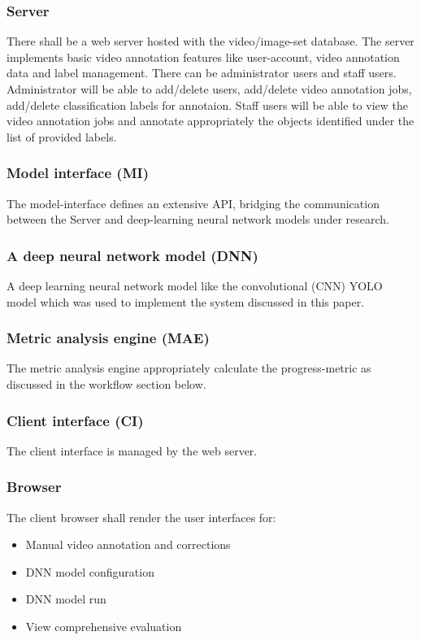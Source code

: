 \documentclass[conference]{IEEEtran}
\begin{document}
\subsubsection{Server}
There shall be a web server hosted with the video/image-set database. The server implements basic video annotation features like user-account, video annotation data and label management. There can be administrator users and staff users. Administrator will be able to add/delete users, add/delete video annotation jobs, add/delete classification labels for annotaion. Staff users will be able to view the video annotation jobs and annotate appropriately the objects identified under the list of provided labels.
\subsubsection{Model interface (MI)}
The model-interface defines an extensive API, bridging the communication between the Server and deep-learning neural network models under research.
\subsubsection{A deep neural network model (DNN)}
A deep learning neural network model like the convolutional (CNN) YOLO model which was used to implement the system discussed in this paper.
\subsubsection{Metric analysis engine (MAE)}
The metric analysis engine appropriately calculate the progress-metric as discussed in the workflow section below.
\subsubsection{Client interface (CI)}
The client interface is managed by the web server.
\subsubsection{Browser}
The client browser shall render the user interfaces for:
\begin{itemize}
	\item Manual video annotation and corrections
	\item DNN model configuration
	\item DNN model run
	\item View comprehensive evaluation
\end{itemize}
\end{document}
